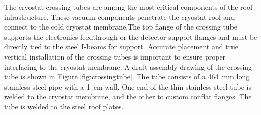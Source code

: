 The cryostat crossing tubes are among the most critical  components of the roof infrastructure. %
These  vacuum components penetrate the cryostat roof and connect to the cold cryostat membrane.The top flange of the crossing tube supports  the electronics feedthrough or the detector support flanges and must be directly tied to the steel I-beams for support. %
Accurate placement and true vertical installation of the crossing tubes is important to ensure proper interfacing to the cryostat membrane. A draft assembly drawing of the crossing tube is shown in Figure \ref{fig:crossingtube}. The tube consists of a \SI{464}{mm} long stainless steel pipe with a \SI{1}{cm}  wall. One end of the thin stainless steel tube is welded to the cryostat membrane, %
and the other to custom conflat flanges. %
The %
tube is welded to the steel roof plates.  


